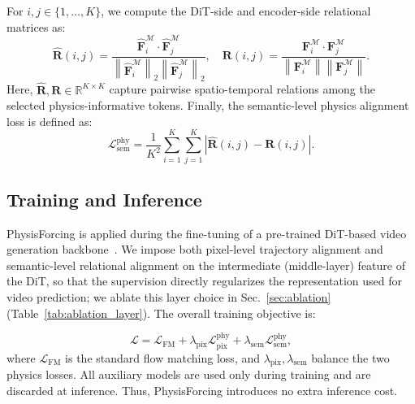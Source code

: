 For $i,j\in\{1,\ldots,K\}$, we compute the DiT-side and encoder-side relational matrices as:
\begin{equation}
\hat{\mathbf{R}}(i,j)
=
\frac{
\hat{\mathbf{F}}^{\mathcal{M}}_{i}\cdot \hat{\mathbf{F}}^{\mathcal{M}}_{j}
}{
\left\|\hat{\mathbf{F}}^{\mathcal{M}}_{i}\right\|_2
\left\|\hat{\mathbf{F}}^{\mathcal{M}}_{j}\right\|_2
},
\quad
\mathbf{R}(i,j)
=
\frac{
\mathbf{F}^{\mathcal{M}}_{i}\cdot \mathbf{F}^{\mathcal{M}}_{j}
}{
\left\|\mathbf{F}^{\mathcal{M}}_{i}\right\|
\left\|\mathbf{F}^{\mathcal{M}}_{j}\right\|
}.
\end{equation}
Here, $\hat{\mathbf{R}},\mathbf{R}\in\mathbb{R}^{K\times K}$ capture pairwise spatio-temporal relations
among the selected physics-informative tokens. Finally, the semantic-level physics alignment loss is defined as:
\begin{equation}
\mathcal{L}^{\mathrm{phy}}_{\mathrm{sem}}
=
\frac{1}{K^2}
\sum_{i=1}^{K}
\sum_{j=1}^{K}
\left|
\hat{\mathbf{R}}(i,j)-\mathbf{R}(i,j)
\right|.
\end{equation}


\subsection{Training and Inference}

PhysisForcing is applied during the fine-tuning of a pre-trained DiT-based video generation
backbone~\cite{wan2025wan}. We impose both pixel-level trajectory alignment and semantic-level relational alignment on the
intermediate (middle-layer) feature of the DiT, so that the supervision directly regularizes the
representation used for video prediction; we ablate this layer choice in
Sec.~\ref{sec:ablation} (Table~\ref{tab:ablation_layer}). The overall training objective is:

\begin{equation}
\mathcal{L}
=
\mathcal{L}_{\mathrm{FM}}
+
\lambda_{\mathrm{pix}}\mathcal{L}^{\mathrm{phy}}_{\mathrm{pix}}
+
\lambda_{\mathrm{sem}}\mathcal{L}^{\mathrm{phy}}_{\mathrm{sem}},
\end{equation}
where $\mathcal{L}_{\mathrm{FM}}$ is the standard flow matching loss, and
$\lambda_{\mathrm{pix}},\lambda_{\mathrm{sem}}$ balance the two physics losses. All auxiliary models are used
only during training and are discarded at inference. Thus, PhysisForcing introduces no extra inference cost.